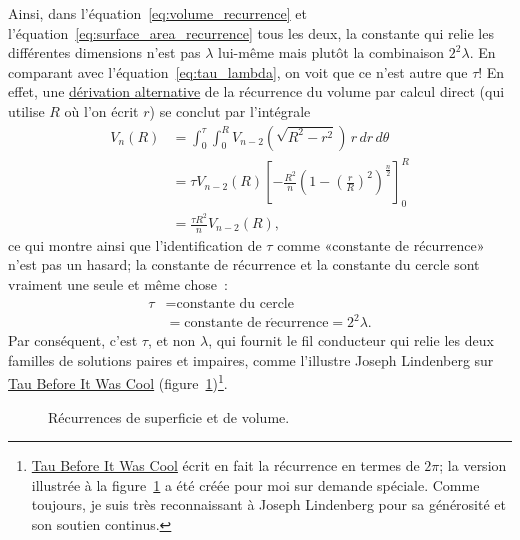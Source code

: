 Ainsi, dans l'équation~\eqref{eq:volume_recurrence} et
l'équation~\eqref{eq:surface_area_recurrence} tous les deux, la constante qui
relie les différentes dimensions n'est pas $\lambda$ lui-même mais plutôt la
combinaison $2^2\lambda$. En comparant avec l'équation~\eqref{eq:tau_lambda}, on
voit que ce n'est autre que $\tau$\ns! En effet, une
\href{https://en.wikipedia.org/wiki/Volume_of_an_n-ball#The_two-dimension_recursion_formula}{dérivation
alternative} de la récurrence du volume par calcul direct (qui utilise $R$ où
l'on écrit $r$) se conclut par l'intégrale
\begin{equation}
\label{eq:integral_recurrence}
\begin{split}
V_n(R) & = \int_0^\tau \int_0^R V_{n-2}\left(\sqrt{R^2 - r^2}\right) \,r\,dr\,d\theta \\
       & = \tau V_{n-2}(R) \left[-\frac{R^2}{n}\left(1 - \left(\frac{r}{R}\right)^2\right)^\frac{n}{2}\right]_{0}^{R} \\
       & = \frac{\tau R^2}{n} V_{n-2}(R),
\end{split}
\end{equation}
ce qui montre ainsi que l'identification de $\tau$ comme «\ns constante de
récurrence\ns » n'est pas un hasard\ns; la constante de récurrence et la constante
du cercle sont vraiment une seule et même chose~:
\[
\begin{split}
\tau & = \mbox{constante du cercle} \\
     & = \mbox{constante de}\; \mathrm{r\acute{e}currence} = 2^2\lambda.
\end{split}
\]
Par conséquent, c'est $\tau$, et non $\lambda$, qui fournit le fil conducteur
qui relie les deux familles de solutions paires et impaires, comme l'illustre
Joseph Lindenberg sur
\href{https://sites.google.com/site/taubeforeitwascool/}{Tau Before It Was Cool}
(figure~\ref{fig:Nspheres})\ns\footnote{\href{https://sites.google.com/site/taubeforeitwascool/}{Tau
Before It Was Cool} écrit en fait la récurrence en termes de $2\pi$\ns; la
version illustrée à la figure~\ref{fig:Nspheres} a été créée pour moi sur
demande spéciale. Comme toujours, je suis très reconnaissant à Joseph Lindenberg
pour sa générosité et son soutien continus.}.

\begin{figure}
\begin{center}
\end{center}
\caption{Récurrences de superficie et de volume.\label{fig:Nspheres}}
\end{figure}

